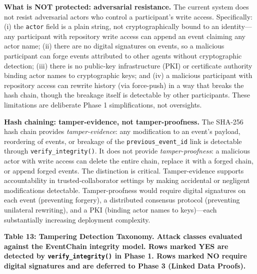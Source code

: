 \textbf{What is NOT protected: adversarial resistance.} The current system does not resist adversarial actors who control a participant's write access. Specifically: (i) the \texttt{actor} field is a plain string, not cryptographically bound to an identity---any participant with repository write access can append an event claiming any actor name; (ii) there are no digital signatures on events, so a malicious participant can forge events attributed to other agents without cryptographic detection; (iii) there is no public-key infrastructure (PKI) or certificate authority binding actor names to cryptographic keys; and (iv) a malicious participant with repository access can rewrite history (via force-push) in a way that breaks the hash chain, though the breakage itself is detectable by other participants. These limitations are deliberate Phase 1 simplifications, not oversights.

\textbf{Hash chaining: tamper-evidence, not tamper-proofness.} The SHA-256 hash chain provides \emph{tamper-evidence}: any modification to an event's payload, reordering of events, or breakage of the \texttt{previous\_event\_id} link is detectable through \texttt{verify\_integrity()}. It does not provide \emph{tamper-proofness}: a malicious actor with write access can delete the entire chain, replace it with a forged chain, or append forged events. The distinction is critical. Tamper-evidence supports accountability in trusted-collaborator settings by making accidental or negligent modifications detectable. Tamper-proofness would require digital signatures on each event (preventing forgery), a distributed consensus protocol (preventing unilateral rewriting), and a PKI (binding actor names to keys)---each substantially increasing deployment complexity.

\textbf{Table 13: Tampering Detection Taxonomy. Attack classes evaluated against the EventChain integrity model. Rows marked YES are detected by \texttt{verify\_integrity()} in Phase 1. Rows marked NO require digital signatures and are deferred to Phase 3 (Linked Data Proofs).}


